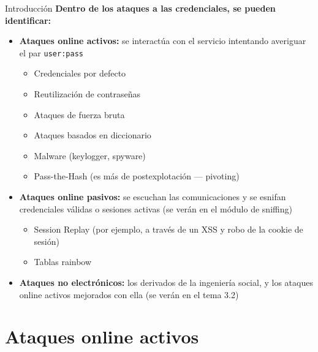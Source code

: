 \documentclass[aspectratio=169,11pt]{beamer}
\newcommand{\cmd}[1]{\texttt{#1}}
\newcommand{\lead}[1]{{\bfseries #1}\par\medskip}
\begin{document}
\begin{frame}[allowframebreaks]{Introducción}
\small
\lead{Dentro de los ataques a las credenciales, se pueden identificar:}
  \begin{itemize}
  \item \textbf{Ataques online activos:} se interactúa con el servicio intentando averiguar el par \cmd{user:pass}
    \begin{itemize}
    \item Credenciales por defecto
    \item Reutilización de contraseñas
    \item Ataques de fuerza bruta
    \item Ataques basados en diccionario
    \item Malware (keylogger, spyware)
    \item Pass-the-Hash (es más de postexplotación --- pivoting)
    \end{itemize}
  \item \textbf{Ataques online pasivos:} se escuchan las comunicaciones y se esnifan credenciales válidas o sesiones activas (se verán en el módulo de sniffing)
    \begin{itemize}
    \item Session Replay (por ejemplo, a través de un XSS y robo de la cookie de sesión)
    \item Tablas rainbow
    \end{itemize}
  \item \textbf{Ataques no electrónicos:} los derivados de la ingeniería social, y los ataques online activos mejorados con ella (se verán en el tema 3.2)
  \end{itemize}
\end{frame}

\section{Ataques online activos}
\end{document}
